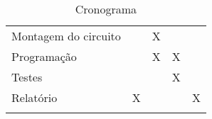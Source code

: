 \begin{longtable}[c]{@{}lllll@{}}
\begin{minipage}[t]{0.39\columnwidth}
Montagem do circuito
\end{minipage} & \begin{minipage}[t]{0.12\columnwidth}\raggedright
\end{minipage} & \begin{minipage}[t]{0.12\columnwidth}\raggedright
X
\end{minipage} & \begin{minipage}[t]{0.12\columnwidth}\raggedright
\end{minipage} & \begin{minipage}[t]{0.12\columnwidth}\raggedright
\end{minipage}
\\\addlinespace
\begin{minipage}[t]{0.39\columnwidth}\raggedright
Programação
\end{minipage} & \begin{minipage}[t]{0.12\columnwidth}\raggedright
\end{minipage} & \begin{minipage}[t]{0.12\columnwidth}\raggedright
X
\end{minipage} & \begin{minipage}[t]{0.12\columnwidth}\raggedright
X
\end{minipage} & \begin{minipage}[t]{0.12\columnwidth}\raggedright
\end{minipage}
\\\addlinespace
\begin{minipage}[t]{0.39\columnwidth}\raggedright
Testes
\end{minipage} & \begin{minipage}[t]{0.12\columnwidth}\raggedright
\end{minipage} & \begin{minipage}[t]{0.12\columnwidth}\raggedright
\end{minipage} & \begin{minipage}[t]{0.12\columnwidth}\raggedright
X
\end{minipage} & \begin{minipage}[t]{0.12\columnwidth}\raggedright
\end{minipage}
\\\addlinespace
\begin{minipage}[t]{0.39\columnwidth}\raggedright
Relatório
\end{minipage} & \begin{minipage}[t]{0.12\columnwidth}\raggedright
X
\end{minipage} & \begin{minipage}[t]{0.12\columnwidth}\raggedright
\end{minipage} & \begin{minipage}[t]{0.12\columnwidth}\raggedright
\end{minipage} & \begin{minipage}[t]{0.12\columnwidth}\raggedright
X
\end{minipage}
\\\addlinespace
\bottomrule
\addlinespace
\caption{Cronograma}
\end{longtable}
